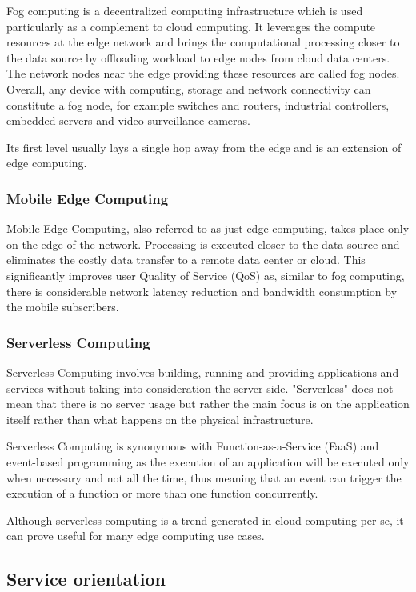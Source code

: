 \documentclass{ieeeaccess}
\begin{document}
Fog computing is a decentralized computing infrastructure which is used particularly as a complement to cloud computing. It leverages the compute resources at the edge network and brings the computational processing closer to the data source by offloading workload to edge nodes from cloud data centers. The network nodes near the edge providing these resources are called fog nodes. Overall, any device with computing, storage and network connectivity can constitute a fog node, for example switches and routers, industrial controllers, embedded servers and video surveillance cameras.

Its first level usually lays a single hop away from the edge and is an extension of edge computing.

\subsubsection{Mobile Edge Computing}

Mobile Edge Computing, also referred to as just edge computing, takes place only on the edge of the network. Processing is executed closer to the data source and eliminates the costly data transfer to a remote data center or cloud. This significantly improves user Quality of Service (QoS) as, similar to fog computing, there is considerable network latency reduction and bandwidth consumption by the mobile subscribers.

\subsubsection{Serverless Computing}

Serverless Computing involves building, running and providing applications and services without taking into consideration the server side. "Serverless" does not mean that there is no server usage but rather the main focus is on the application itself rather than what happens on the physical infrastructure.

Serverless Computing is synonymous with Function-as-a-Service (FaaS) and event-based programming as the execution of an application will be executed only when necessary and not all the time, thus meaning that an event can trigger the execution of a function or more than one function concurrently.

Although serverless computing is a trend generated in cloud computing per se, it can prove useful for many edge computing use cases.

\subsection{Service orientation}
\end{document}
